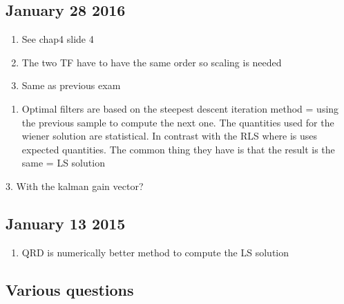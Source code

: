 \documentclass[
  a4paper,
  ,captions=tableheading
]{scrartcl}
\providecommand{\tightlist}{%
  \setlength{\itemsep}{0pt}\setlength{\parskip}{0pt}}
\begin{document}
\subsection{January 28 2016}\label{january-28-2016}

\begin{enumerate}
\def\labelenumi{\arabic{enumi}.}
\tightlist
\item
  See chap4 slide 4\\
\item
  The two TF have to have the same order so scaling is needed\\
\item
  Same as previous exam
\end{enumerate}

\begin{enumerate}
\def\labelenumi{\arabic{enumi}.}
\tightlist
\item
  Optimal filters are based on the steepest descent iteration method =
  using the previous sample to compute the next one. The quantities used
  for the wiener solution are statistical. In contrast with the RLS
  where is uses expected quantities. The common thing they have is that
  the result is the same = LS solution
\end{enumerate}

3. With the kalman gain vector?

\subsection{January 13 2015}\label{january-13-2015}

\begin{enumerate}
\def\labelenumi{\arabic{enumi}.}
\setcounter{enumi}{1}
\tightlist
\item
  QRD is numerically better method to compute the LS solution
\end{enumerate}

\subsection{}\label{section-26}

\subsection{}\label{section-27}

\subsection{Various questions}\label{various-questions}
\end{document}
